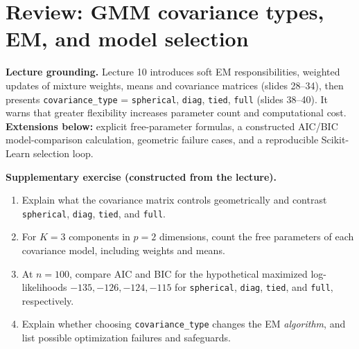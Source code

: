 \section{Review: GMM covariance types, EM, and model selection}
\label{sec:review-covariance}
\begin{concept}
\textbf{Lecture grounding.} Lecture 10 introduces soft EM responsibilities, weighted updates of mixture weights, means and covariance matrices (slides 28--34), then presents \texttt{covariance\_type} = \texttt{spherical}, \texttt{diag}, \texttt{tied}, \texttt{full} (slides 38--40). It warns that greater flexibility increases parameter count and computational cost. \textbf{Extensions below:} explicit free-parameter formulas, a constructed AIC/BIC model-comparison calculation, geometric failure cases, and a reproducible Scikit-Learn selection loop.
\end{concept}
\begin{reviewproblem}
\textbf{Supplementary exercise (constructed from the lecture).}
\begin{enumerate}[label=\textbf{(\alph*)}]
\item Explain what the covariance matrix controls geometrically and contrast \texttt{spherical}, \texttt{diag}, \texttt{tied}, and \texttt{full}.
\item For $K=3$ components in $p=2$ dimensions, count the free parameters of each covariance model, including weights and means.
\item At $n=100$, compare AIC and BIC for the hypothetical maximized log-likelihoods $-135,-126,-124,-115$ for \texttt{spherical}, \texttt{diag}, \texttt{tied}, and \texttt{full}, respectively.
\item Explain whether choosing \texttt{covariance\_type} changes the EM \emph{algorithm}, and list possible optimization failures and safeguards.
\end{enumerate}
\end{reviewproblem}

